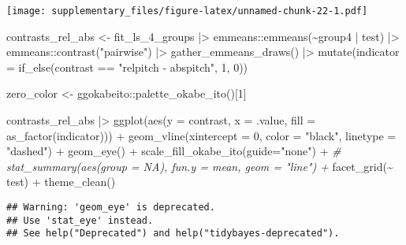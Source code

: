 \documentclass[
  man,floatsintext]{apa7}
\newenvironment{Shaded}{\begin{snugshade}}{\end{snugshade}}
\newcommand{\AttributeTok}[1]{\textcolor[rgb]{0.77,0.63,0.00}{#1}}
\newcommand{\CommentTok}[1]{\textcolor[rgb]{0.56,0.35,0.01}{\textit{#1}}}
\newcommand{\DecValTok}[1]{\textcolor[rgb]{0.00,0.00,0.81}{#1}}
\newcommand{\FunctionTok}[1]{\textcolor[rgb]{0.00,0.00,0.00}{#1}}
\newcommand{\NormalTok}[1]{#1}
\newcommand{\OtherTok}[1]{\textcolor[rgb]{0.56,0.35,0.01}{#1}}
\newcommand{\SpecialCharTok}[1]{\textcolor[rgb]{0.00,0.00,0.00}{#1}}
\newcommand{\StringTok}[1]{\textcolor[rgb]{0.31,0.60,0.02}{#1}}
\begin{document}
\texttt{[image: supplementary\_files/figure-latex/unnamed-chunk-22-1.pdf]}

\begin{Shaded}
\begin{Highlighting}[]
\NormalTok{contrasts\_rel\_abs }\OtherTok{\textless{}{-}}\NormalTok{ fit\_ls\_4\_groups }\SpecialCharTok{|\textgreater{}} 
\NormalTok{  emmeans}\SpecialCharTok{::}\FunctionTok{emmeans}\NormalTok{(}\SpecialCharTok{\textasciitilde{}}\NormalTok{group4 }\SpecialCharTok{|}\NormalTok{ test) }\SpecialCharTok{|\textgreater{}} 
\NormalTok{  emmeans}\SpecialCharTok{::}\FunctionTok{contrast}\NormalTok{(}\StringTok{"pairwise"}\NormalTok{) }\SpecialCharTok{|\textgreater{}} 
  \FunctionTok{gather\_emmeans\_draws}\NormalTok{() }\SpecialCharTok{|\textgreater{}} 
  \FunctionTok{mutate}\NormalTok{(}\AttributeTok{indicator =} \FunctionTok{if\_else}\NormalTok{(contrast }\SpecialCharTok{==} \StringTok{"relpitch {-} abspitch"}\NormalTok{, }\DecValTok{1}\NormalTok{, }\DecValTok{0}\NormalTok{))}
\end{Highlighting}
\end{Shaded}

\begin{Shaded}
\begin{Highlighting}[]
\NormalTok{zero\_color }\OtherTok{\textless{}{-}}\NormalTok{ ggokabeito}\SpecialCharTok{::}\FunctionTok{palette\_okabe\_ito}\NormalTok{()[}\DecValTok{1}\NormalTok{]}

\NormalTok{contrasts\_rel\_abs }\SpecialCharTok{|\textgreater{}} 
  \FunctionTok{ggplot}\NormalTok{(}\FunctionTok{aes}\NormalTok{(}\AttributeTok{y =}\NormalTok{ contrast, }\AttributeTok{x =}\NormalTok{ .value, }\AttributeTok{fill =} \FunctionTok{as\_factor}\NormalTok{(indicator))) }\SpecialCharTok{+}
  \FunctionTok{geom\_vline}\NormalTok{(}\AttributeTok{xintercept =} \DecValTok{0}\NormalTok{, }\AttributeTok{color =} \StringTok{"black"}\NormalTok{, }\AttributeTok{linetype =} \StringTok{"dashed"}\NormalTok{) }\SpecialCharTok{+}
  \FunctionTok{geom\_eye}\NormalTok{() }\SpecialCharTok{+}
  \FunctionTok{scale\_fill\_okabe\_ito}\NormalTok{(}\AttributeTok{guide=}\StringTok{"none"}\NormalTok{) }\SpecialCharTok{+}
  \CommentTok{\# stat\_summary(aes(group = NA), fun.y = mean, geom = "line") +}
  \FunctionTok{facet\_grid}\NormalTok{(}\SpecialCharTok{\textasciitilde{}}\NormalTok{ test) }\SpecialCharTok{+}
  \FunctionTok{theme\_clean}\NormalTok{()}
\end{Highlighting}
\end{Shaded}

\begin{verbatim}
## Warning: 'geom_eye' is deprecated.
## Use 'stat_eye' instead.
## See help("Deprecated") and help("tidybayes-deprecated").
\end{verbatim}
\end{document}
